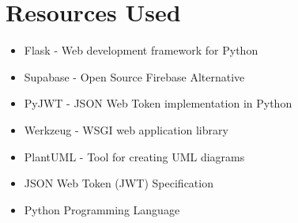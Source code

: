 \documentclass[12pt,a4paper]{article}
\begin{document}
\section{Resources Used}
\begin{itemize}
    \item Flask - Web development framework for Python
    \item Supabase - Open Source Firebase Alternative 
    \item PyJWT - JSON Web Token implementation in Python
    \item Werkzeug - WSGI web application library
    \item PlantUML - Tool for creating UML diagrams
    \item JSON Web Token (JWT) Specification
    \item Python Programming Language
\end{itemize}
\end{document}
